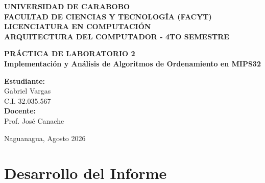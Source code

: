 \documentclass[12pt,letterpaper]{article}
\begin{document}
\begin{titlepage}
    \centering
    \vspace*{1cm}
    {\Large \textbf{UNIVERSIDAD DE CARABOBO}} \\
    \vspace{0.3cm}
    {\Large \textbf{FACULTAD DE CIENCIAS Y TECNOLOGÍA (FACYT)}} \\
    \vspace{0.3cm}
    {\Large \textbf{LICENCIATURA EN COMPUTACIÓN}} \\
    \vspace{0.3cm}
    {\large \textbf{ARQUITECTURA DEL COMPUTADOR - 4TO SEMESTRE}} \\

    \vspace{4cm}

    {\huge \textbf{PRÁCTICA DE LABORATORIO 2}} \\
    \vspace{0.5cm}
    {\Large \textbf{Implementación y Análisis de Algoritmos de Ordenamiento en MIPS32}} \\

    \vspace{5cm}

    \begin{flushright}
        {\large \textbf{Estudiante:}} \\
        {\large Gabriel Vargas} \\
        {\large C.I. 32.035.567} \\
        \vspace{1cm}
        {\large \textbf{Docente:}} \\
        {\large Prof. José Canache}
    \end{flushright}

    \vfill

    {\large Naguanagua, Agosto 2026}
\end{titlepage}

\newpage
{}
\section*{Desarrollo del Informe}
\end{document}
